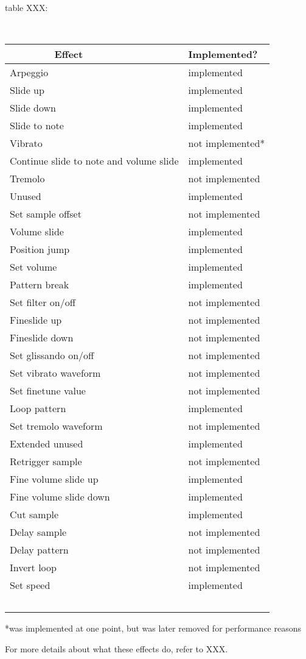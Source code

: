 table XXX:
\begin{table}
        \begin{tabular}{|l|l|}

        \hline
        Effect & Implemented? \\
        \hline
        \hline
        Arpeggio & implemented \\
        \hline
        Slide up & implemented \\
        \hline
        Slide down & implemented \\
        \hline
        Slide to note & implemented \\
        \hline
        Vibrato & not implemented* \\
        \hline
        Continue slide to note and volume slide & implemented \\
        \hline
        Tremolo & not implemented \\
        \hline
        Unused & implemented \\
        \hline
        Set sample offset & not implemented \\
        \hline
        Volume slide & implemented \\
        \hline
        Position jump & implemented \\
        \hline
        Set volume & implemented \\
        \hline
        Pattern break & implemented \\
        \hline
        Set filter on/off & not implemented \\
        \hline
        Fineslide up & not implemented \\
        \hline
        Fineslide down & not implemented \\
        \hline
        Set glissando on/off & not implemented \\
        \hline
        Set vibrato waveform & not implemented \\
        \hline
        Set finetune value & not implemented \\
        \hline
        Loop pattern & implemented \\
        \hline
        Set tremolo waveform & not implemented \\
        \hline
        Extended unused & implemented \\
        \hline
        Retrigger sample & not implemented \\
        \hline
        Fine volume slide up & implemented \\
        \hline
        Fine volume slide down & implemented \\
        \hline
        Cut sample & implemented \\
        \hline
        Delay sample & not implemented \\
        \hline
        Delay pattern & not implemented \\
        \hline
        Invert loop & not implemented \\
        \hline
        Set speed & implemented \\
        \hline
        \end{tabular}
\end{table}

*was implemented at one point, but was later removed for performance reasons


For more details about what these effects do, refer to XXX.
